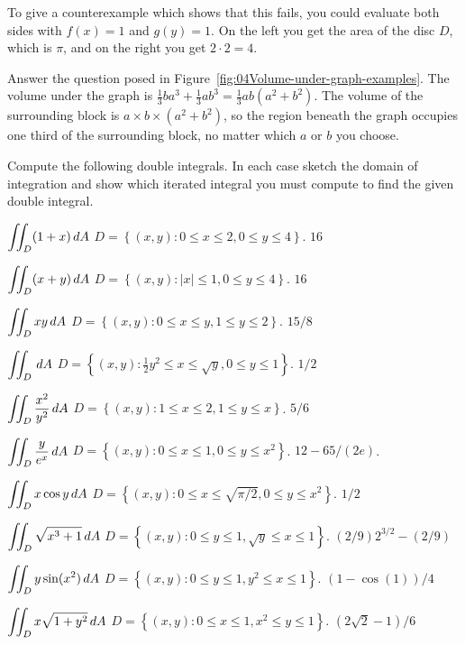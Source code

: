 To give a counterexample which shows that this fails, you could evaluate both sides with $f(x) = 1$ and $g(y)=1$.  On the left you get the area of the disc $D$, which is $\pi$, and on the right you get $2\cdot2=4$.
\endanswer


\problem Answer the question posed in
Figure~\ref{fig:04Volume-under-graph-examples}.
\answer
The volume under the graph is
$\frac13 ba^3 + \frac13 ab^3 = \frac 13 ab(a^2+b^2)$.
The volume of the surrounding block is $a\times b\times (a^2+b^2)$, so
the region beneath the graph occupies one third of the surrounding
block, no matter which $a$ or $b$ you choose.
\endanswer


\problem Compute the following double integrals.  
In each case sketch the domain of integration and
show which iterated integral you must compute to find the given double
integral.


\subprob $\displaystyle \iint_D (1+x) \,dA $
\hfill$D = \left\{ (x,y) : 0\leq x\leq 2, 0\leq y\leq 4 \right\}$.
\answer
$16$
\endanswer

\subprob $\displaystyle \iint_D (x+y)\,dA $ 
\hfill$D = \left\{ (x,y) : |x|\leq1, 0\leq y\leq 4 \right\}$.
\answer
$16$
\endanswer


\subprob $\displaystyle \iint_D xy \,dA $ 
\hfill$D = \left\{ (x,y) : 0\le x\le y, 1\le y \le 2 \right\}$.
\answer
$15/8$
\endanswer


\subprob $\displaystyle \iint_{D} \,dA $ 
\hfill$D = \left\{ (x,y) : \tfrac12y^2\le x\le \sqrt{y}, 0\le y\le 1 \right\}$.
\answer
$1/2$
\endanswer


\subprob $\displaystyle \iint_{D} {x^2\over y^2}\,dA $ 
\hfill$D = \left\{ (x,y) : 1\le x\le2, 1\le y\le x \right\}$.
\answer
$5/6$
\endanswer


\subprob $\displaystyle \iint_D {y\over e^x}\,dA $ 
\hfill$D = \left\{ (x,y) : 0\le x\le1, 0\le y\le x^2 \right\}$.
\answer
$12-65/(2e)$.
\endanswer


\subprob $\displaystyle \iint_D x\cos y\,dA $ 
\hfill$D = \left\{ (x,y) : 0\le x\le \sqrt{\pi/2}, 0\le y\le x^2 \right\}$.
\answer
$1/2$
\endanswer


\subprob  $\displaystyle \iint_D  
\sqrt{x^3+1}\,dA $
\hfill$D = \left\{ (x,y) : 0\le y\le 1, \surd y\le x\le 1 \right\}$.
\answer
$(2/9)2^{3/2}-(2/9)$
\endanswer

\subprob $\displaystyle \iint_D   y\sin(x^2)\,dA $
\hfill$D = \left\{ (x,y) : 0\le y\le 1, y^2\le x\le 1 \right\}$.
\answer
$(1-\cos(1))/4$
\endanswer

\subprob $\displaystyle \iint_D x\sqrt{1+y^2}\,dA $ 
\hfill$D = \left\{ (x,y) : 0\le x\le1, x^2\le y\le1 \right\}$.
\answer
$(2\sqrt2-1)/6$
\endanswer

